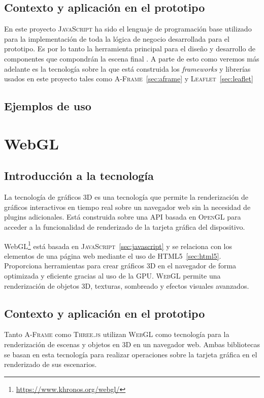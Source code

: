 \documentclass[a4paper, 11pt]{book}
\begin{document}
\subsection{Contexto y aplicación en el prototipo}
En este proyecto \textsc{JavaScript} ha sido el lenguaje de programación base utilizado para la implementación de toda la lógica de negocio desarrollada para el prototipo. Es por lo tanto la herramienta principal para el diseño y desarrollo de componentes que compondrán la escena final . A parte de esto como veremos más adelante es la tecnología sobre la que está construida los \emph{frameworks} y librerías usados en este proyecto tales como \textsc{A-Frame}~\ref{sec:aframe} y \textsc{Leaflet}~\ref{sec:leaflet}
\subsection{Ejemplos de uso}

\section{WebGL}
\label{sec:webgl}
\subsection{Introducción a la tecnología}
La tecnología de gráficos \textsc{\gls{3D}} es una tecnología que permite la renderización de gráficos interactivos en tiempo real sobre un navegador web sin la necesidad de plugins adicionales. Está construida sobre una \textsc{\gls{API}} basada en \textsc{\gls{OpenGL}} para acceder a la funcionalidad de renderizado de la tarjeta gráfica del dispositivo.

WebGL\footnote{\url{https://www.khronos.org/webgl/}} está basada en \textsc{JavaScript}~\ref{sec:javascript} y se relaciona con los elementos de una página web mediante el uso de \textsc{HTML5}~\ref{sec:html5}. 
Proporciona herramientas para crear gráficos \textsc{3D} en el navegador de forma optimizada y eficiente gracias al uso de la \gls{GPU}. \textsc{WebGL} permite una renderización de objetos 3D, texturas, sombreado y efectos visuales avanzados.
\subsection{Contexto y aplicación en el prototipo}
 Tanto \textsc{A-Frame} como \textsc{Three.js} utilizan \textsc{WebGL} como tecnología para la renderización de escenas y objetos en \textsc{3D} en un navegador web. Ambas bibliotecas se basan en esta tecnología para realizar operaciones sobre la tarjeta gráfica en el renderizado de sus escenarios.
\end{document}

